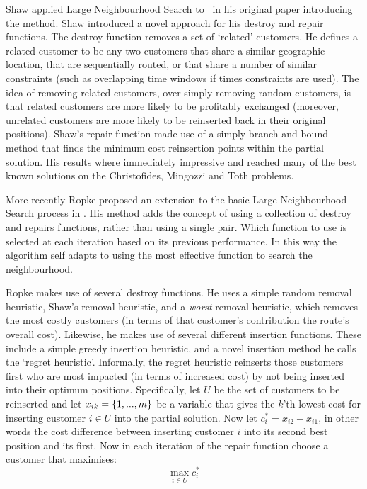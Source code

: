 Shaw applied Large Neighbourhood Search to \VRP\ in his original paper introducing the method\cite{Shaw:1998}. Shaw introduced a novel approach for his destroy and repair functions. The destroy function removes a set of `related' customers. He defines a related customer to be any two customers that share a similar geographic location, that are sequentially routed, or that share a number of similar constraints (such as overlapping time windows if times constraints are used). The idea of removing related customers, over simply removing random customers, is that related customers are more likely to be profitably exchanged (moreover, unrelated customers are more likely to be reinserted back in their original positions). Shaw's repair function made use of a simply branch and bound method that finds the minimum cost reinsertion points within the partial solution. His results where immediately impressive and reached many of the best known solutions on the Christofides, Mingozzi and Toth problems\cite{CMT:1981}.

More recently Ropke proposed an extension to the basic Large Neighbourhood Search process in \cite{Ropke:2005}. His method adds the concept of using a collection of destroy and repairs functions, rather than using a single pair. Which function to use is selected at each iteration based on its previous performance. In this way the algorithm self adapts to using the most effective function to search the neighbourhood. 

Ropke makes use of several destroy functions. He uses a simple random removal heuristic, Shaw's removal heuristic, and a \emph{worst} removal heuristic, which removes the most costly customers (in terms of that customer's contribution the route's overall cost). Likewise, he makes use of several different insertion functions. These include a simple greedy insertion heuristic, and a novel insertion method he calls the `regret heuristic'. Informally, the regret heuristic reinserts those customers first who are most impacted (in terms of increased cost) by not being inserted into their optimum positions. Specifically, let $U$ be the set of customers to be reinserted and let $x_{ik} = \{1,...,m\}$ be a variable that gives the $k$'th lowest cost for inserting customer $i \in U$ into the partial solution. Now let $c_i^* = x_{i2} - x_{i1}$, in other words the cost difference between inserting customer $i$ into its second best position and its first. Now in each iteration of the repair function choose a customer that maximises:
\[
   \operatorname*{max}_{i \in U} c_i^*
\]

